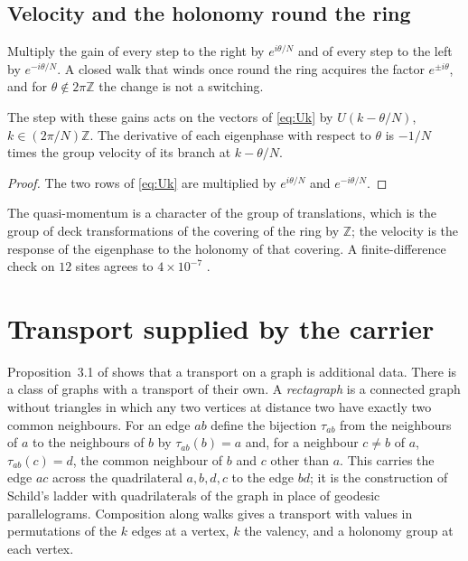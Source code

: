 \subsection{Velocity and the holonomy round the ring}
Multiply the gain of every step to the right by $e^{i\theta/N}$ and of every step to the left by $e^{-i\theta/N}$. A closed walk that winds once round the ring acquires the factor $e^{\pm i\theta}$, and for $\theta\notin2\pi\mathbb{Z}$ the change is not a switching.

\begin{proposition}\label{prop:twist}
The step with these gains acts on the vectors of \eqref{eq:Uk} by $U(k-\theta/N)$, $k\in(2\pi/N)\mathbb{Z}$. The derivative of each eigenphase with respect to $\theta$ is $-1/N$ times the group velocity of its branch at $k-\theta/N$.
\end{proposition}
\begin{proof}
The two rows of \eqref{eq:Uk} are multiplied by $e^{i\theta/N}$ and $e^{-i\theta/N}$.
\end{proof}
The quasi-momentum is a character of the group of translations, which is the group of deck transformations of the covering of the ring by $\mathbb{Z}$; the velocity is the response of the eigenphase to the holonomy of that covering. A finite-difference check on $12$ sites agrees to $4\times10^{-7}$ \cite{comp3}.

\section{Transport supplied by the carrier}\label{sec:ladder}

Proposition~3.1 of \cite{g7} shows that a transport on a graph is additional data. There is a class of graphs with a transport of their own. A \emph{rectagraph} is a connected graph without triangles in which any two vertices at distance two have exactly two common neighbours. For an edge $ab$ define the bijection $\tau_{ab}$ from the neighbours of $a$ to the neighbours of $b$ by $\tau_{ab}(b)=a$ and, for a neighbour $c\ne b$ of $a$, $\tau_{ab}(c)=d$, the common neighbour of $b$ and $c$ other than $a$. This carries the edge $ac$ across the quadrilateral $a,b,d,c$ to the edge $bd$; it is the construction of Schild's ladder with quadrilaterals of the graph in place of geodesic parallelograms. Composition along walks gives a transport with values in permutations of the $k$ edges at a vertex, $k$ the valency, and a holonomy group at each vertex.

